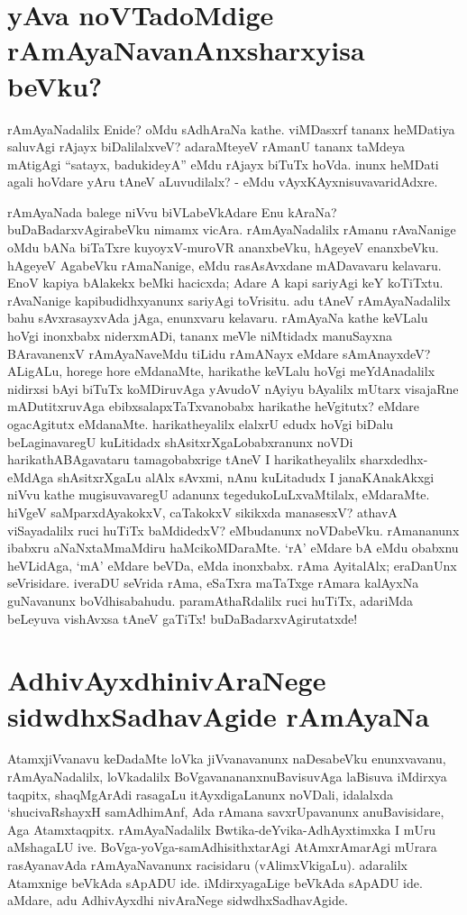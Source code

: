 \section*{yAva noVTadoMdige rAmAyaNavanAnxsharxyisa beVku?}

rAmAyaNadalilx Enide? oMdu sAdhAraNa kathe. viMDasxrf tananx heMDatiya saluvAgi rAjayx biDalilalxveV? adaraMteyeV rAmanU tananx taMdeya mAtigAgi ``satayx, badukideyA'' eMdu rAjayx biTuTx hoVda. inunx heMDati agali hoVdare yAru tAneV aLuvudilalx? - eMdu vAyxKAyxnisuvavaridAdxre.

rAmAyaNada balege niVvu biVLabeVkAdare Enu kAraNa? buDaBadarxvAgirabeVku nimamx vicAra. rAmAyaNadalilx rAmanu rAvaNanige oMdu bANa biTaTxre kuyoyxV-muroVR ananxbeVku, hAgeyeV enanxbeVku. hAgeyeV AgabeVku rAmaNanige, eMdu rasAsAvxdane mADavavaru kelavaru. EnoV kapiya bAlakekx beMki hacicxda; Adare A kapi sariyAgi keY koTiTxtu. rAvaNanige kapibudidhxyanunx sariyAgi toVrisitu. adu tAneV rAmAyaNadalilx bahu sAvxrasayxvAda jAga, enunxvaru kelavaru. rAmAyaNa kathe keVLalu hoVgi inonxbabx niderxmADi, tananx meVle niMtidadx manuSayxna BAravanenxV rAmAyaNaveMdu tiLidu rAmANayx eMdare sAmAnayxdeV? ALigALu, horege hore eMdanaMte, harikathe keVLalu hoVgi meYdAnadalilx nidirxsi bAyi biTuTx  koMDiruvAga yAvudoV nAyiyu bAyalilx mUtarx visajaRne mADutitxruvAga ebibxsalapxTaTxvanobabx harikathe heVgitutx? eMdare ogacAgitutx eMdanaMte. harikatheyalilx elalxrU edudx hoVgi biDalu beLaginavaregU kuLitidadx shAsitxrXgaLobabxranunx noVDi harikathABAgavataru tamagobabxrige tAneV I harikatheyalilx sharxdedhx-eMdAga shAsitxrXgaLu alAlx sAvxmi, nAnu kuLitadudx I janaKAnakAkxgi niVvu kathe mugisuvavaregU adanunx tegedukoLuLxvaMtilalx, eMdaraMte. hiVgeV saMparxdAyakokxV, caTakokxV sikikxda manasesxV? athavA viSayadalilx ruci huTiTx baMdidedxV? eMbudanunx noVDabeVku. rAmananunx ibabxru aNaNxtaMmaMdiru haMcikoMDaraMte. `rA' eMdare bA eMdu obabxnu heVLidAga, `mA' eMdare beVDa, eMda inonxbabx. rAma AyitalAlx; eraDanUnx seVrisidare. iveraDU seVrida rAma, eSaTxra maTaTxge rAmara kalAyxNa guNavanunx boVdhisabahudu. paramAthaRdalilx ruci huTiTx, adariMda beLeyuva vishAvxsa tAneV gaTiTx! buDaBadarxvAgirutatxde!

\section*{AdhivAyxdhinivAraNege sidwdhxSadhavAgide rAmAyaNa}

AtamxjiVvanavu keDadaMte loVka jiVvanavanunx naDesabeVku enunxvavanu, rAmAyaNadalilx, loVkadalilx BoVgavanananxnuBavisuvAga laBisuva iMdirxya taqpitx, shaqMgArAdi rasagaLu itAyxdigaLanunx noVDali, idalalxda `shucivaRshayxH samAdhimAnf,\label{255} Ada rAmana savxrUpavanunx anuBavisidare, Aga Atamxtaqpitx. rAmAyaNadalilx Bwtika-deYvika-AdhAyxtimxka I mUru aMshagaLU ive. BoVga-yoVga-samAdhisithxtarAgi AtAmxrAmarAgi mUrara rasAyanavAda rAmAyaNavanunx racisidaru (vAlimxVkigaLu). adaralilx Atamxnige beVkAda sApADU ide. iMdirxyagaLige beVkAda sApADU ide. aMdare, adu AdhivAyxdhi nivAraNege sidwdhxSadhavAgide.  
